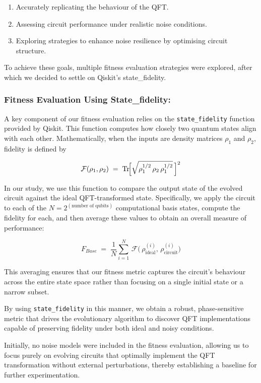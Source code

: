 \documentclass[11pt,a4paper]{article}
\begin{document}
\begin{enumerate}
    \item Accurately replicating the behaviour of the QFT.
    \item Assessing circuit performance under realistic noise conditions.
    \item Exploring strategies to enhance noise resilience by optimising circuit structure.
\end{enumerate}

To achieve these goals, multiple fitness evaluation strategies were explored, after which we decided to settle on Qiskit's state\_fidelity.

\subsubsection*{Fitness Evaluation Using State\_fidelity:}
A key component of our fitness evaluation relies on the \texttt{state\_fidelity} \cite{state_fidelity} function provided by Qiskit. This function computes how closely two quantum states align with each other. Mathematically, when the inputs are density matrices $\rho_1$ and $\rho_2$, fidelity is defined by

\[
\mathcal{F}(\rho_1, \rho_2) \;=\; 
\mathrm{Tr}\!\Bigl[\sqrt{\rho_1^{1/2}\,\rho_2\,\rho_1^{1/2}}\,\Bigr]^2
\]

In our study, we use this function to compare the output state of the evolved circuit against the ideal QFT-transformed state. Specifically, we apply the circuit to each of the $N = 2^{(\text{number of qubits})}$ computational basis states, compute the fidelity for each, and then average these values to obtain an overall measure of performance:

\[
F_{Base} \;=\;
\frac{1}{N}\sum_{i=1}^{N} \,
\mathcal{F}\bigl(\,\rho_{\mathrm{ideal}}^{(i)}, \,\rho_{\mathrm{circuit}}^{(i)}\bigr)
\]

This averaging ensures that our fitness metric captures the circuit's behaviour across the entire state space rather than focusing on a single initial state or a narrow subset.\newline

By using \texttt{state\_fidelity} in this manner, we obtain a robust, phase-sensitive metric that drives the evolutionary algorithm to discover QFT implementations capable of preserving fidelity under both ideal and noisy conditions.

Initially, no noise models were included in the fitness evaluation, allowing us to focus purely on evolving circuits that optimally implement the QFT transformation without external perturbations, thereby establishing a baseline for further experimentation.\newline
\end{document}
